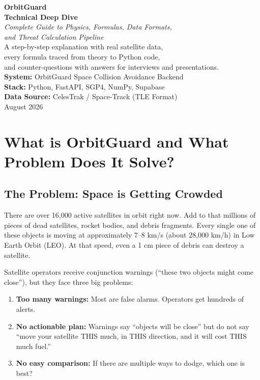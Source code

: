\documentclass[12pt,a4paper]{article}
\begin{document}
\begin{titlepage}
\centering
\vspace*{2cm}
{\Huge\bfseries OrbitGuard\\[0.3cm] Technical Deep Dive}\\[1cm]
{\Large\itshape Complete Guide to Physics, Formulas, Data Formats,\\and Threat Calculation Pipeline}\\[2cm]
{\large A step-by-step explanation with real satellite data,\\
every formula traced from theory to Python code,\\
and counter-questions with answers for interviews and presentations.}\\[3cm]
{\large\textbf{System:} OrbitGuard Space Collision Avoidance Backend}\\[0.3cm]
{\large\textbf{Stack:} Python, FastAPI, SGP4, NumPy, Supabase}\\[0.3cm]
{\large\textbf{Data Source:} CelesTrak / Space-Track (TLE Format)}\\[2cm]
{\large August 2026}
\end{titlepage}

\tableofcontents
\newpage

\section{What is OrbitGuard and What Problem Does It Solve?}

\subsection{The Problem: Space is Getting Crowded}
There are over 16,000 active satellites in orbit right now. Add to that millions of pieces of dead satellites, rocket bodies, and debris fragments. Every single one of these objects is moving at approximately 7--8 km/s (about 28,000 km/h) in Low Earth Orbit (LEO). At that speed, even a 1 cm piece of debris can destroy a satellite.

Satellite operators receive conjunction warnings (``these two objects might come close''), but they face three big problems:
\begin{enumerate}
    \item \textbf{Too many warnings:} Most are false alarms. Operators get hundreds of alerts.
    \item \textbf{No actionable plan:} Warnings say ``objects will be close'' but do not say ``move your satellite THIS much, in THIS direction, and it will cost THIS much fuel.''
    \item \textbf{No easy comparison:} If there are multiple ways to dodge, which one is best?
\end{enumerate}
\end{document}

